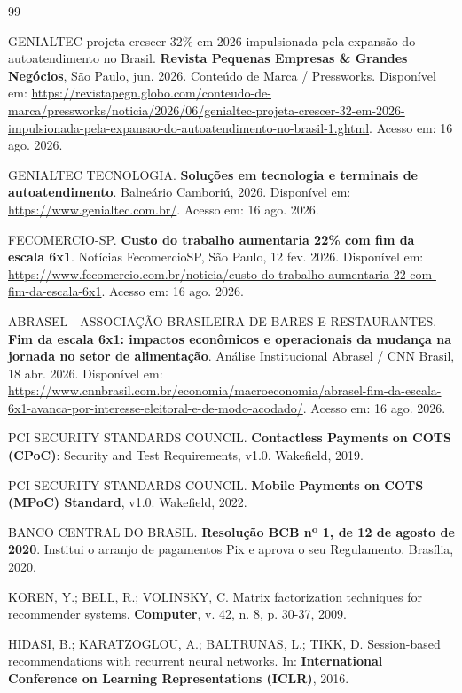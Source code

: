 \documentclass[12pt,a4paper]{article}
\begin{document}
{\raggedright
\begin{thebibliography}{99}

GENIALTEC projeta crescer 32\% em 2026 impulsionada pela expansão do autoatendimento no Brasil. \textbf{Revista Pequenas Empresas \& Grandes Negócios}, São Paulo, jun. 2026. Conteúdo de Marca / Pressworks. Disponível em: \url{https://revistapegn.globo.com/conteudo-de-marca/pressworks/noticia/2026/06/genialtec-projeta-crescer-32-em-2026-impulsionada-pela-expansao-do-autoatendimento-no-brasil-1.ghtml}. Acesso em: 16 ago. 2026.

GENIALTEC TECNOLOGIA. \textbf{Soluções em tecnologia e terminais de autoatendimento}. Balneário Camboriú, 2026. Disponível em: \url{https://www.genialtec.com.br/}. Acesso em: 16 ago. 2026.

FECOMERCIO-SP. \textbf{Custo do trabalho aumentaria 22\% com fim da escala 6x1}. Notícias FecomercioSP, São Paulo, 12 fev. 2026. Disponível em: \url{https://www.fecomercio.com.br/noticia/custo-do-trabalho-aumentaria-22-com-fim-da-escala-6x1}. Acesso em: 16 ago. 2026.

ABRASEL - ASSOCIAÇÃO BRASILEIRA DE BARES E RESTAURANTES. \textbf{Fim da escala 6x1: impactos econômicos e operacionais da mudança na jornada no setor de alimentação}. Análise Institucional Abrasel / CNN Brasil, 18 abr. 2026. Disponível em: \url{https://www.cnnbrasil.com.br/economia/macroeconomia/abrasel-fim-da-escala-6x1-avanca-por-interesse-eleitoral-e-de-modo-acodado/}. Acesso em: 16 ago. 2026.

PCI SECURITY STANDARDS COUNCIL. \textbf{Contactless Payments on COTS (CPoC)}: Security and Test Requirements, v1.0. Wakefield, 2019.

PCI SECURITY STANDARDS COUNCIL. \textbf{Mobile Payments on COTS (MPoC) Standard}, v1.0. Wakefield, 2022.

BANCO CENTRAL DO BRASIL. \textbf{Resolução BCB nº 1, de 12 de agosto de 2020}. Institui o arranjo de pagamentos Pix e aprova o seu Regulamento. Brasília, 2020.

KOREN, Y.; BELL, R.; VOLINSKY, C. Matrix factorization techniques for recommender systems. \textbf{Computer}, v. 42, n. 8, p. 30-37, 2009.

HIDASI, B.; KARATZOGLOU, A.; BALTRUNAS, L.; TIKK, D. Session-based recommendations with recurrent neural networks. In: \textbf{International Conference on Learning Representations (ICLR)}, 2016.


\end{thebibliography}}
\end{document}

